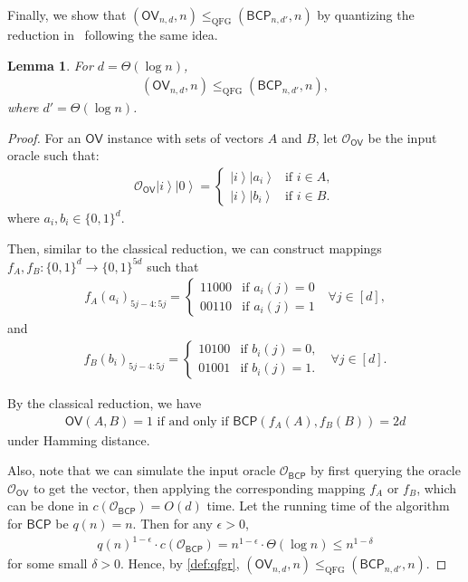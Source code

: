 \documentclass[10pt,a4paper]{article}
\newtheorem{lemma}[theorem]{Lemma}
\newcommand{\ket}[1]{\left| #1 \right\rangle}
\newcommand{\ora}{\mathcal{O}}
\newcommand{\QFG}{\mathrm{QFG}}
\newcommand{\OV}{\ensuremath{\mathsf{OV}}}
\newcommand{\BCP}{\ensuremath{\mathsf{BCP}}}
\begin{document}
Finally, we show that $(\textsf{OV}_{n,d},n)\leq_{\QFG} (\textsf{BCP}_{n,d'},n)$ by quantizing the reduction in~\cite{r29} following the same idea. 
\begin{lemma}\label{lem:ov_q_bcp}
For $d=\Theta(\log n)$, 
\begin{align} 
    (\OV_{n,d},n)\leq_{\QFG} (\BCP_{n,d'},n),
\end{align}
where $d'=\Theta(\log n)$.
\end{lemma}
\begin{proof}
For an $\OV$ instance with sets of vectors $A$ and $B$, let $\ora_{\OV}$ be the input oracle such that:
\begin{align}
    \ora_{\OV}\ket{i}\ket{0}=\begin{cases}
        \ket{i}\ket{a_i} & \text{if }i\in A,\\
        \ket{i}\ket{b_i} & \text{if }i\in B.
    \end{cases}
\end{align}
where $a_i,b_i\in \{0,1\}^d$.

Then, similar to the classical reduction, we can construct mappings $f_A, f_B:\{0,1\}^d\rightarrow \{0,1\}^{5d}$ such that
\begin{align}
    f_A(a_i)_{5j-4:5j}=\begin{cases}
        11000 & \text{if }a_i(j)=0\\
        00110 & \text{if }a_i(j)=1
    \end{cases}~~~\forall j\in [d],
\end{align}
and
\begin{align}
    f_B(b_i)_{5j-4:5j}=\begin{cases}
        10100 & \text{if }b_i(j)=0,\\
        01001 & \text{if }b_i(j)=1.
    \end{cases} ~~~\forall j\in [d].
\end{align}

By the classical reduction, we have
\begin{align}
    \textsf{OV}(A,B)=1 \text{ if and only if }\textsf{BCP}(f_A(A),f_B(B))=2d
\end{align}
under Hamming distance. 

Also, note that we can simulate the input oracle $\ora_{\BCP}$ by first querying the oracle $\ora_{\OV}$ to get the vector, then applying the corresponding mapping $f_A$ or $f_B$, which can be done in $c(\ora_{\BCP})=O(d)$ time. Let the running time of the algorithm for $\textsf{BCP}$ be $q(n)=n$. Then for any $\epsilon>0$,
\begin{align}
    q(n)^{1-\epsilon}\cdot c(\ora_{\BCP})=n^{1-\epsilon}\cdot \Theta(\log n)\leq n^{1-\delta}
\end{align}
for some small $\delta >0$. Hence, by \cref{def:qfgr}, $(\textsf{OV}_{n,d},n)\leq_{\QFG} (\textsf{BCP}_{n,d'},n)$.
\end{proof}
 
\end{document}
